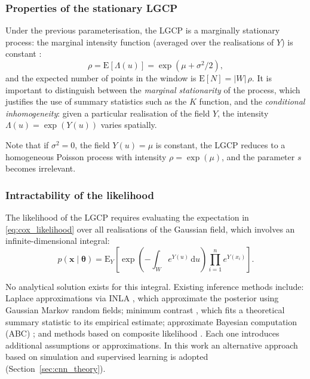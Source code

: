 \documentclass[a4paper,fleqn]{cas-sc}
\numberwithin{equation}{section}
\begin{document}
\subsubsection{Properties of the stationary LGCP}

Under the previous parameterisation, the LGCP is a marginally
stationary process: the marginal intensity function (averaged over the
realisations of $Y$) is constant \citep{Moller1998}:
\begin{equation}
    \rho = \mathrm{E}[\Lambda(u)] = \exp(\mu + \sigma^2/2),
    \label{eq:lgcp_rho}
\end{equation}
and the expected number of points in the window is
$\mathrm{E}[N] = |W|\,\rho$. It is important to distinguish between the
\emph{marginal stationarity} of the process, which justifies the use
of summary statistics such as the $K$ function, and the
\emph{conditional inhomogeneity}: given a particular realisation of
the field $Y$, the intensity $\Lambda(u)=\exp(Y(u))$ varies spatially.

Note that if $\sigma^2=0$, the field $Y(u)=\mu$ is constant, the LGCP
reduces to a homogeneous Poisson process with intensity
$\rho=\exp(\mu)$, and the parameter $s$ becomes irrelevant.

\subsubsection{Intractability of the likelihood}

The likelihood of the LGCP requires evaluating the expectation in
\eqref{eq:cox_likelihood} over all realisations of the Gaussian field,
which involves an infinite-dimensional integral:
\begin{equation}
    p(\mathbf{x}\mid\boldsymbol{\theta}) =
    \mathrm{E}_{Y}\!\left[\exp\!\left(-\int_W\!e^{Y(u)}\,\mathrm{d}u\right)
    \prod_{i=1}^{n}e^{Y(x_i)}\right].
    \label{eq:lgcp_lik}
\end{equation}

No analytical solution exists for this integral. Existing inference
methods include: Laplace approximations via INLA
\citep{Rue2009,toolboxINLA}, which approximate the posterior using
Gaussian Markov random fields; minimum contrast
\citep{mincon83, mincon84}, which fits a theoretical summary statistic
to its empirical estimate; approximate Bayesian computation (ABC)
\citep{ABCoverview}; and methods based on composite likelihood
\citep{complik}. Each one introduces additional assumptions or
approximations. In this work an alternative approach based on
simulation and supervised learning is adopted
(Section~\ref{sec:cnn_theory}).
\end{document}

